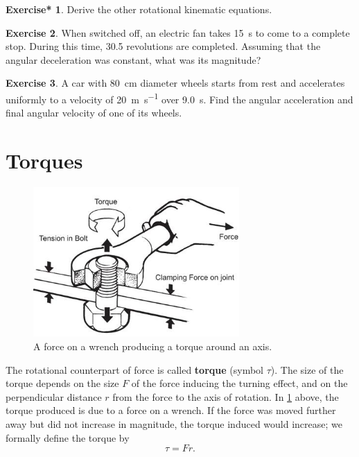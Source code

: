 \documentclass[a4paper]{amsbook}
\theoremstyle{definition}
\newtheorem{exercise}{Exercise}
\numberwithin{exercise}{chapter}
\newtheorem{exercise*}[exercise]{Exercise*}
\numberwithin{exercise}{chapter}
\begin{document}
\begin{exercise*}
  Derive the other rotational kinematic equations.
\end{exercise*}

\begin{exercise}
  When switched off, an electric fan takes \SI{15}{\second} to come to a complete stop. During this time,
  30.5 revolutions are completed. Assuming that the angular deceleration was constant, what was its magnitude?
\end{exercise}

\begin{exercise}
  A car with \SI{80}{\centi\metre} diameter wheels starts from rest and accelerates uniformly to a velocity of \SI{20}{\metre\per\second}
  over \SI{9.0}{\second}. Find the angular acceleration and final angular velocity of one of its wheels.
\end{exercise}

\section{Torques}
\begin{figure}
  \centering
  \includegraphics[width=0.7\textwidth]{torque}
  \caption{A force on a wrench producing a torque around an axis.\label{fig:torque}}
\end{figure}
The rotational counterpart of force is called \textbf{torque} (symbol $ \tau $). The size of the torque depends
on the size $ F $ of the force inducing the turning effect, and on the perpendicular distance $ r $ from the force
to the axis of rotation. In \cref{fig:torque} above, the torque produced is due to a force on a wrench. If the
force was moved further away but did not increase in magnitude, the torque induced would increase; we formally
define the torque by
\begin{equation}
  \tau = Fr.
\end{equation}
\end{document}
